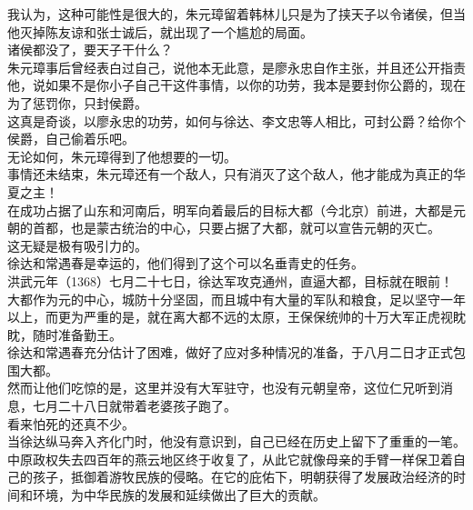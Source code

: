 \begin{multicols}{\theparacolNo}
我认为，这种可能性是很大的，朱元璋留着韩林儿只是为了挟天子以令诸侯，但当他灭掉陈友谅和张士诚后，就出现了一个尴尬的局面。\\

诸侯都没了，要天子干什么？\\

朱元璋事后曾经表白过自己，说他本无此意，是廖永忠自作主张，并且还公开指责他，说如果不是你小子自己干这件事情，以你的功劳，我本是要封你公爵的，现在为了惩罚你，只封侯爵。\\

这真是奇谈，以廖永忠的功劳，如何与徐达、李文忠等人相比，可封公爵？给你个侯爵，自己偷着乐吧。\\

无论如何，朱元璋得到了他想要的一切。\\

事情还未结束，朱元璋还有一个敌人，只有消灭了这个敌人，他才能成为真正的华夏之主！\\

在成功占据了山东和河南后，明军向着最后的目标大都（今北京）前进，大都是元朝的首都，也是蒙古统治的中心，只要占据了大都，就可以宣告元朝的灭亡。\\

这无疑是极有吸引力的。\\

徐达和常遇春是幸运的，他们得到了这个可以名垂青史的任务。\\

洪武元年（1368）七月二十七日，徐达军攻克通州，直逼大都，目标就在眼前！\\

大都作为元的中心，城防十分坚固，而且城中有大量的军队和粮食，足以坚守一年以上，而更为严重的是，就在离大都不远的太原，王保保统帅的十万大军正虎视眈眈，随时准备勤王。\\

徐达和常遇春充分估计了困难，做好了应对多种情况的准备，于八月二日才正式包围大都。\\

然而让他们吃惊的是，这里并没有大军驻守，也没有元朝皇帝，这位仁兄听到消息，七月二十八日就带着老婆孩子跑了。\\

看来怕死的还真不少。\\

当徐达纵马奔入齐化门时，他没有意识到，自己已经在历史上留下了重重的一笔。\\

中原政权失去四百年的燕云地区终于收复了，从此它就像母亲的手臂一样保卫着自己的孩子，抵御着游牧民族的侵略。在它的庇佑下，明朝获得了发展政治经济的时间和环境，为中华民族的发展和延续做出了巨大的贡献。\\


\end{multicols}
